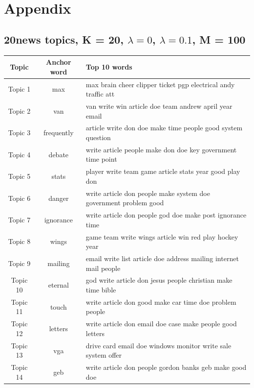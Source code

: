 \documentclass{article}
\begin{document}
\newpage
\section{Appendix}


\subsection{20news topics, K = 20, $\lambda=0$, $\lambda=0.1$, M = 100}
\label{appendix:K20-M100}

\begin{table}[h]
   \begin{center}
  \begin{tabular}{|c|c|l|} \hline
           Topic & Anchor word & Top 10 words \\ \hline
   Topic	1	&	max & max brain cheer clipper ticket pgp electrical andy traffic att	\\ \hline
Topic	2	&	van & van write win article doe team andrew april year email	\\ \hline
Topic	3	&	frequently & article write don doe make time people good system question	\\ \hline
Topic	4	&	debate & write article people make don doe key government time point	\\ \hline
Topic	5	&	stats & player write team game article stats year good play don	\\ \hline
Topic	6	&	danger & write article don people make system doe government problem good	\\ \hline
Topic	7	&	ignorance & write article don people god doe make post ignorance time	\\ \hline
Topic	8	&	wings & game team write wings article win red play hockey year	\\ \hline
Topic	9	&	mailing & email write list article doe address mailing internet mail people	\\ \hline
Topic	10	&	eternal & god write article don jesus people christian make time bible	\\ \hline
Topic	11	&	touch & write article don good make car time doe problem people	\\ \hline
Topic	12	&	letters & write article don email doe case make people good letters	\\ \hline
Topic	13	&	vga & drive card email doe windows monitor write sale system offer	\\ \hline
Topic	14	&	geb & write article don people gordon banks geb make good doe	\\ \hline

\end{tabular}
\end{center}
\end{table}
\end{document}
